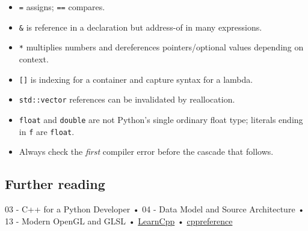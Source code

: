 \documentclass[
  10pt,
  a4paper,
]{article}
\providecommand{\tightlist}{%
  \setlength{\itemsep}{0pt}\setlength{\parskip}{0pt}}
\begin{document}
\begin{itemize}
\tightlist
\item
  \texttt{=} assigns; \texttt{==} compares.
\item
  \texttt{\&} is reference in a declaration but address-of in many
  expressions.
\item
  \texttt{*} multiplies numbers and dereferences pointers/optional
  values depending on context.
\item
  \texttt{{[}{]}} is indexing for a container and capture syntax for a
  lambda.
\item
  \texttt{std::vector} references can be invalidated by reallocation.
\item
  \texttt{float} and \texttt{double} are not Python's single ordinary
  float type; literals ending in \texttt{f} are \texttt{float}.
\item
  Always check the \emph{first} compiler error before the cascade that
  follows.
\end{itemize}

\subsection{Further reading}\label{further-reading}

03 - C++ for a Python Developer • 04 - Data Model and Source
Architecture • 13 - Modern OpenGL and GLSL •
\href{https://www.learncpp.com/}{LearnCpp} •
\href{https://en.cppreference.com/}{cppreference}

\newpage
\end{document}
